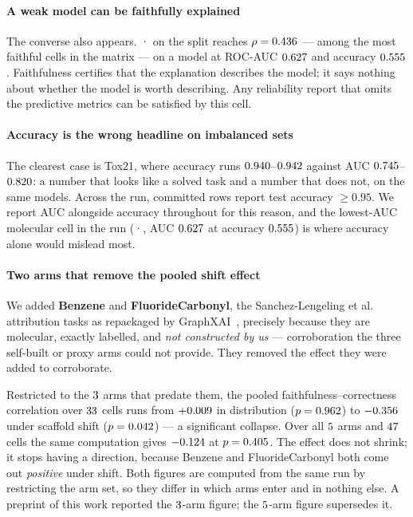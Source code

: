 \ifHasWeakFaithful
\paragraph{A weak model can be faithfully explained} The converse also appears.
\weakFaithfulDataset{}·\weakFaithfulBackbone{} on the \weakFaithfulSplit{}
split reaches $\rho=0.436{}$ --- among the most faithful cells in
the matrix --- on a model at ROC-AUC $0.627{}$ and accuracy
$0.555{}$. Faithfulness certifies that the explanation describes the
model; it says nothing about whether the model is worth describing. Any
reliability report that omits the predictive metrics can be satisfied by this
cell.
\fi

\paragraph{Accuracy is the wrong headline on imbalanced sets}
\ifHasTox
The clearest case is Tox21, where accuracy runs
$0.940{}$--$0.942{}$ against AUC $0.745{}$--$0.820{}$: a
number that looks like a solved task and a number that does not, on the same
models.
\fi
Across the run, \nHighAccRows{} committed rows report test accuracy $\geq0.95$.
We report AUC alongside accuracy throughout for this reason, and the lowest-AUC
molecular cell in the run (\worstAucDataset{}·\worstAucBackbone{}, AUC $0.627{}$
at accuracy $0.555{}$) is where accuracy alone would mislead most.

\paragraph{Two arms that remove the pooled shift effect} We added
\textbf{Benzene} and \textbf{FluorideCarbonyl}, the Sanchez-Lengeling
et al.~\cite{sanchez2020} attribution tasks as repackaged by
GraphXAI~\cite{graphxai}, precisely because they are molecular, exactly
labelled, and \emph{not constructed by us} --- corroboration the three
self-built or proxy arms could not provide. They removed the effect they were
added to corroborate.

\ifHasPriorPool
Restricted to the $3{}$ arms that predate them, the pooled
faithfulness--correctness correlation over $33{}$ cells runs
from $+0.009{}$ in distribution ($p=0.962{}$) to
$-0.356{}$ under scaffold shift ($p=0.042{}$) --- a
significant collapse. Over all $5{}$ arms and $47{}$
cells the same computation gives $-0.124{}$ at $p=0.405{}$.
The effect does not shrink; it stops having a direction, because Benzene and
FluorideCarbonyl both come out \emph{positive} under shift. Both figures are
computed from the same run by restricting the arm set, so they differ in which
arms enter and in nothing else. A preprint of this work reported the
$3{}$-arm figure; the $5{}$-arm figure supersedes
it.
\fi


